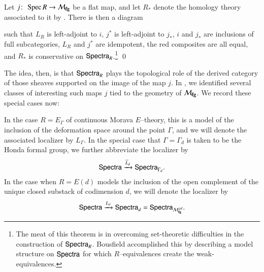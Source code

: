 \begin{theorem}
Let $j\colon\thinspace \operatorname{Spec} R \to \mathcal{M}_{\mathbf{fg}}$ be a flat map, and let $R_*$ denote the homology theory associated to it by .  There is then a diagram
\begin{center}
\end{center}
such that $L_R$ is left-adjoint to $i$, $j^*$ is left-adjoint to $j_*$, $i$ and $j_*$ are inclusions of full subcategories, $L_R$ and $j^*$ are idempotent, the red composites are all equal, and $R_*$ is conservative on $\mathsf{Spectra}_R$.\footnote{The meat of this theorem is in overcoming set-theoretic difficulties in the construction of $\mathsf{Spectra}_R$.  Bousfield accomplished this by describing a model structure on $\mathsf{Spectra}$ for which $R$--equivalences create the weak-equivalences.} \qed
\end{theorem}

The idea, then, is that $\mathsf{Spectra}_R$ plays the topological role of the derived category of those sheaves supported on the image of the map $j$.  In , we identified several classes of interesting such maps $j$ tied to the geometry of $\mathcal{M}_{\mathbf{fg}}$.  We record these special cases now:
\begin{definition}
In the case $R = E_\Gamma$ of continuous Morava $E$--theory, this is a model of the inclusion of the deformation space around the point $\Gamma$, and we will denote the associated localizer by $L_\Gamma$.  In the special case that $\Gamma = \Gamma_d$ is taken to be the Honda formal group, we further abbreviate the localizer by \[\mathsf{Spectra} \xrightarrow{\widehat L_d} \mathsf{Spectra}_{\Gamma_d}.\]  In the case when $R = E(d)$ models the inclusion of the open complement of the unique closed substack of codimension $d$, we will denote the localizer by \[\mathsf{Spectra} \xrightarrow{L_d} \mathsf{Spectra}_d = \mathsf{Spectra}_{\mathcal{M}_{\mathbf{fg}}^{\le d}}.\]
\end{definition}

